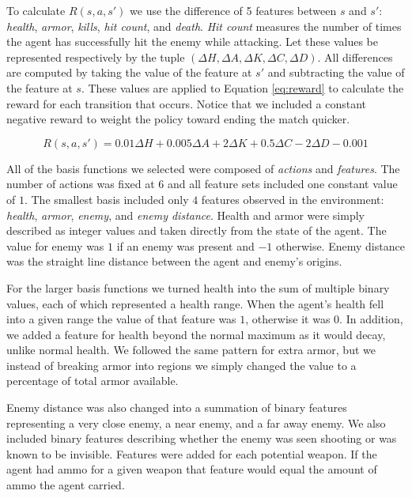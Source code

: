 To calculate $R(s,a,s')$ we use the difference of 5 features between $s$ and $s'$: \emph{health}, \emph{armor}, \emph{kills}, \emph{hit count}, and \emph{death}. \emph{Hit count} measures the number of times the agent has successfully hit the enemy while attacking. Let these values be represented respectively by the tuple $(\Delta H, \Delta A, \Delta K, \Delta C, \Delta D)$. All differences are computed by taking the value of the feature at $s'$ and subtracting the value of the feature at $s$. These values are applied to Equation \ref{eq:reward} to calculate the reward for each transition that occurs.  Notice that we included a constant negative reward to weight the policy toward ending the match quicker.

\begin{equation}
    R(s,a,s') = 0.01\Delta H + 0.005\Delta A + 2\Delta K + 0.5\Delta C - 2\Delta D - 0.001 
\label{eq:reward}
\end{equation}

All of the basis functions we selected were composed of \emph{actions} and \emph{features}. The number of actions was fixed at $6$ and all feature sets included one constant value of $1$. The smallest basis included only $4$ features observed in the environment: \emph{health}, \emph{armor}, \emph{enemy}, and \emph{enemy distance}. Health and armor were simply described as integer values and taken directly from the state of the agent. The value for enemy was $1$ if an enemy was present and $-1$ otherwise. Enemy distance was the straight line distance between the agent and enemy's origins.

For the larger basis functions we turned health into the sum of multiple binary values, each of which represented a health range. When the agent's health fell into a given range the value of that feature was $1$, otherwise it was $0$. In addition, we added a feature for health beyond the normal maximum as it would decay, unlike normal health. We followed the same pattern for extra armor, but we instead of breaking armor into regions we simply changed the value to a percentage of total armor available.

Enemy distance was also changed into a summation of binary features representing a very close enemy, a near enemy, and a far away enemy. We also included binary features describing whether the enemy was seen shooting or was known to be invisible. Features were added for each potential weapon. If the agent had ammo for a given weapon that feature would equal the amount of ammo the agent carried.

